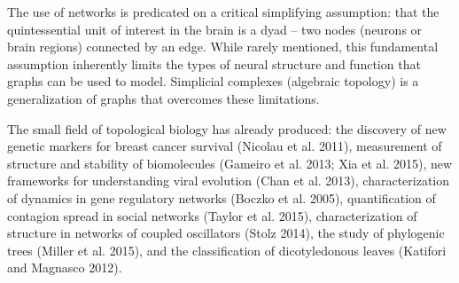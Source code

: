 \documentclass[onecollarge,runningheads]{svjour2}
\begin{document}
  




\citep{giusti2016two} The use of networks is predicated on a critical simplifying assumption: that the quintessential unit of interest in the brain is a dyad – two nodes (neurons or brain regions) connected by an edge. While rarely mentioned, this fundamental assumption inherently
limits the types of neural structure and function that graphs can be used to model. Simplicial complexes (algebraic topology) is a generalization of graphs that overcomes these limitations.








The small field of topological biology has already produced: the discovery of new genetic markers for breast cancer survival (Nicolau et al. 2011), measurement of structure and stability of biomolecules (Gameiro et al. 2013; Xia et al. 2015), new frameworks for understanding viral evolution (Chan et al. 2013), characterization of dynamics in gene regulatory networks (Boczko et al. 2005), quantification of contagion spread in social networks (Taylor et al. 2015), characterization of structure in networks of coupled oscillators (Stolz 2014), the study of phylogenic trees (Miller et al. 2015), and the classification of dicotyledonous leaves (Katifori and Magnasco 2012).





\end{document}
